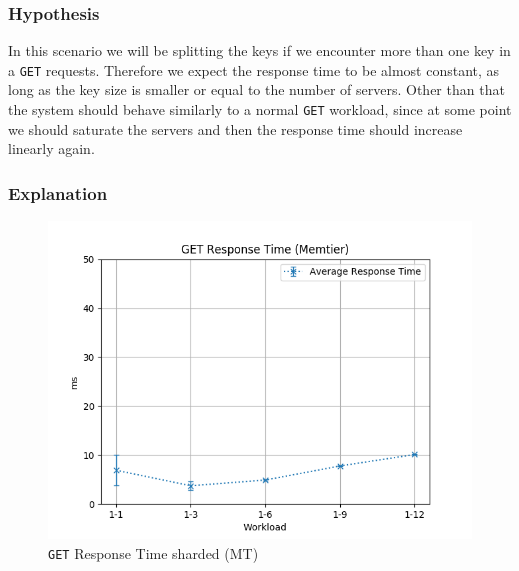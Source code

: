 \documentclass[11pt,a4paper]{article}
\begin{document}
\subsubsection{Hypothesis}
%
In this scenario we will be splitting the keys if we encounter more than one key in a \texttt{GET} requests.
%
Therefore we expect the response time to be almost constant, as long as the key size is smaller or equal to the number of servers.
%
Other than that the system should behave similarly to a normal \texttt{GET} workload, since at some point we should saturate the servers and then the response time should increase linearly again.
%
\subsubsection{Explanation}
%
\begin{figure}[H]
	\centering
	\captionsetup{width=0.4\textwidth}
    \begin{minipage}{0.5\textwidth}
        \centering
        \includegraphics[width=\textwidth]{../illustrations/plots/4_1_full_system_read_sharded/64/memtier_get_rt_ms.png}
        \caption{\texttt{GET} Response Time sharded (MT)}
        \label{fig:full_system_read_sharded_mt_rt}
    \end{minipage}\hfill
    \begin{minipage}{0.5\textwidth}
        \centering

\end{minipage}
\end{figure}
\end{document}
